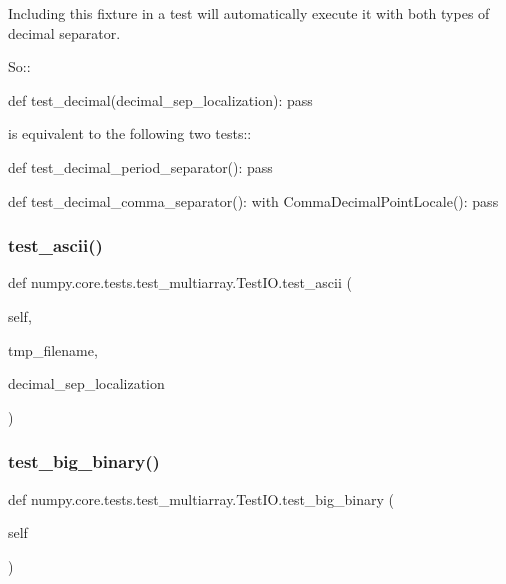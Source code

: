 \begin{DoxyVerb}Including this fixture in a test will automatically
execute it with both types of decimal separator.

So::

    def test_decimal(decimal_sep_localization):
pass

is equivalent to the following two tests::

    def test_decimal_period_separator():
pass

    def test_decimal_comma_separator():
with CommaDecimalPointLocale():
    pass
\end{DoxyVerb}
 \mbox{\label{classnumpy_1_1core_1_1tests_1_1test__multiarray_1_1TestIO_a39fe6cd38e7c3a3259e5769e1755bbb6}} 
\subsubsection{\texorpdfstring{test\+\_\+ascii()}{test\_ascii()}}
{\footnotesize\ttfamily def numpy.\+core.\+tests.\+test\+\_\+multiarray.\+Test\+I\+O.\+test\+\_\+ascii (\begin{DoxyParamCaption}\item[{}]{self,  }\item[{}]{tmp\+\_\+filename,  }\item[{}]{decimal\+\_\+sep\+\_\+localization }\end{DoxyParamCaption})}

\mbox{\label{classnumpy_1_1core_1_1tests_1_1test__multiarray_1_1TestIO_a9166855e7d233ce9f6f8f81576bf7b3e}} 
\subsubsection{\texorpdfstring{test\+\_\+big\+\_\+binary()}{test\_big\_binary()}}
{\footnotesize\ttfamily def numpy.\+core.\+tests.\+test\+\_\+multiarray.\+Test\+I\+O.\+test\+\_\+big\+\_\+binary (\begin{DoxyParamCaption}\item[{}]{self }\end{DoxyParamCaption})}

